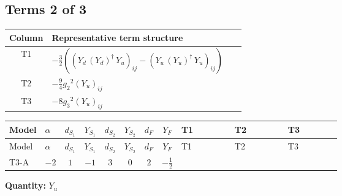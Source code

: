 \documentclass[8pt]{article}
\begin{document}
\begin{landscape}
\subsection*{Terms 2 of 3}
\begin{center}
\begin{tabular}{@{}c >{\raggedright\arraybackslash}p{0.82\linewidth}@{}}
\toprule
Column & Representative term structure \\
\midrule
T1 & \(\displaystyle -\frac{3}{2} (\left({Y_d}\,\left({Y_d}\right)^{\dagger}\,{Y_u}\right)_{ij}-\left({Y_u}\,\left({Y_u}\right)^{\dagger}\,{Y_u}\right)_{ij})\) \\
\midrule
T2 & \(\displaystyle -\frac{9}{4} {g_2}^2 \left({Y_u}\right)_{ij}\) \\
\midrule
T3 & \(\displaystyle -8 {g_3}^2 \left({Y_u}\right)_{ij}\) \\
\midrule
\bottomrule
\end{tabular}
\end{center}
\smallskip
\tiny
\begin{longtable}{@{}llcccccc >{\raggedright\arraybackslash}p{0.21\linewidth} >{\raggedright\arraybackslash}p{0.21\linewidth} >{\raggedright\arraybackslash}p{0.21\linewidth}@{}}
\toprule
Model & $\alpha$ & $d_{S_1}$ & $Y_{S_1}$ & $d_{S_2}$ & $Y_{S_2}$ & $d_F$ & $Y_F$ & T1 & T2 & T3 \\
\midrule
\endfirsthead
\toprule
Model & $\alpha$ & $d_{S_1}$ & $Y_{S_1}$ & $d_{S_2}$ & $Y_{S_2}$ & $d_F$ & $Y_F$ & T1 & T2 & T3 \\
\midrule
\endhead
T3-A & $-2$ & $1$ & $-1$ & $3$ & $0$ & $2$ & $-\frac{1}{2}$ & \scriptsize\adjustbox{max width=\linewidth}{$\begin{gathered} -\frac{3}{2} (\left({Y_d}\,\left({Y_d}\right)^{\dagger}\,{Y_u}\right)_{ij}-\left({Y_u}\,\left({Y_u}\right)^{\dagger}\,{Y_u}\right)_{ij})\end{gathered}$} & \scriptsize\adjustbox{max width=\linewidth}{$\begin{gathered} -\frac{9}{4} {g_2}^2 \left({Y_u}\right)_{ij}\end{gathered}$} & \scriptsize\adjustbox{max width=\linewidth}{$\begin{gathered} -8 {g_3}^2 \left({Y_u}\right)_{ij}\end{gathered}$} \\
\midrule
\bottomrule
\end{longtable}
\clearpage
\noindent\textbf{Quantity: }$Y_u$\par\smallskip

\end{landscape}
\end{document}
